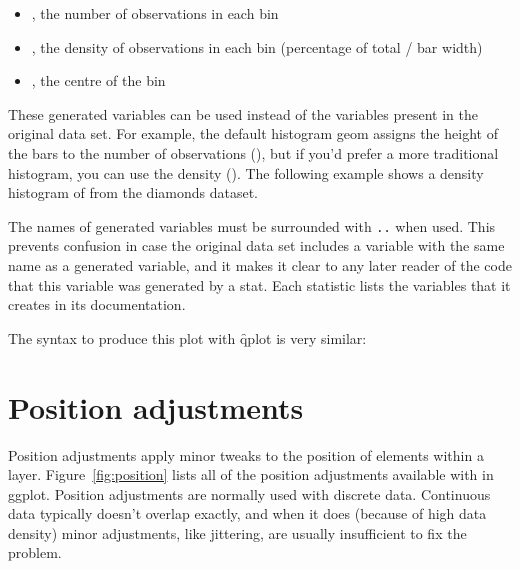 \begin{itemize}
  \item {}, the number of observations in each bin
  \item {}, the density of observations in each bin (percentage of total / bar width)
  \item {}, the centre of the bin
\end{itemize}

These generated variables can be used instead of the variables present in the original data set.  For example, the default histogram geom assigns the height of the bars to the number of observations (), but if you'd prefer a more traditional histogram, you can use the density ().   The following example shows a density histogram of  from the diamonds dataset.

% 


The names of generated variables must be surrounded with {\tt ..} when used.  This prevents confusion in case the original data set includes a variable with the same name as a generated variable, and it makes it clear to any later reader of the code that this variable was generated by a stat.  Each statistic lists the variables that it creates in its documentation.

The syntax to produce this plot with \f{qplot} is very similar:

% 


\section{Position adjustments}
\label{sec:position}

Position adjustments apply minor tweaks to the position of elements within a layer.  Figure~\ref{fig:position} lists all of the position adjustments available with in ggplot.  Position adjustments are normally used with discrete data.  Continuous data typically doesn't overlap exactly, and when it does (because of high data density) minor adjustments, like jittering, are usually insufficient to fix the problem.

